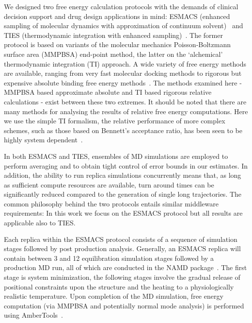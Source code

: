 \documentclass{bmcart}
\begin{document}
We designed two free energy calculation protocols with the demands of clinical
decision support and drug design applications in mind: ESMACS (enhanced
sampling of molecular dynamics with approximation of continuum
solvent)~\cite{Wan2017brd4} and TIES (thermodynamic integration with enhanced
sampling)~\cite{Bhati2017}. The former protocol is based on variants of the
molecular mechanics Poisson-Boltzmann surface area (MMPBSA) end-point method,
the latter on the `alchemical' thermodynamic integration (TI) approach. 
 A wide variety of free energy methods are available, ranging from very fast molecular docking 
 methods to rigorous but expensive absolute binding free energy methods~\cite{Mobley2009}. The methods examined here 
 - MMPBSA based approximate absolute and TI based rigorous relative calculations - 
 exist between these two extremes.  It should be noted that there are many methods for analysing 
 the results of relative free energy  computations. 
 Here we use the simple TI formalism, the relative performance of more complex schemes, such as those based 
 on Bennett's acceptance ratio, has been seen to be highly system dependent~\cite{Ruiter2013, Christ2014, Bhati2018}.

In
both ESMACS and TIES, ensembles of MD simulations are employed to perform averaging and
to obtain tight control of error bounds in our estimates. In addition, the
ability to run replica simulations concurrently means that, as long as
sufficient compute resources are available, turn around times can be
significantly reduced compared to the generation of single long trajectories.
The common philosophy behind the two protocols entails similar middleware
requirements: In this work we focus on the ESMACS protocol but all results are
applicable also to TIES.

Each replica within the ESMACS protocol consists of a sequence of simulation
stages followed by post production analysis. Generally, an ESMACS replica will
contain between 3 and 12 equilibration simulation stages followed by a
production MD run, all of which are conducted in the NAMD
package~\cite{Phillips2005}. The first stage is system minimization, the
following stages involve the gradual release of positional constraints upon
the structure and the heating to a physiologically realistic temperature.
Upon completion of the MD simulation, free energy computation (via MMPBSA and
potentially normal mode analysis) is performed using
AmberTools~\cite{Case2005, MillerIII2012}.
\end{document}
